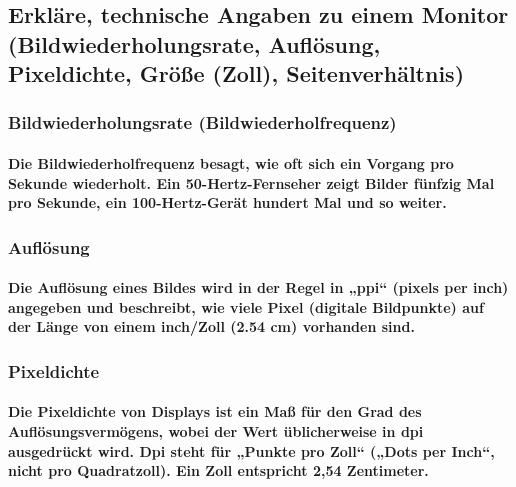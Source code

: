 \documentclass[a4paper]{article}
\begin{document}
    \subsection{\color{red}Erkläre, technische Angaben zu einem Monitor (Bildwiederholungsrate, Auflösung, Pixeldichte,
        Größe (Zoll), Seitenverhältnis)}\label{subsec:erkläre-technische-angaben-zu-einem-monitor-(bildwiederholungsrate-auflösung-pixeldichte
    --------größe-(zoll)-seitenverhältnis)}

    \subsubsection{\color{codegreen}Bildwiederholungsrate (Bildwiederholfrequenz)}

    \paragraph{\color{codegreen} Die Bildwiederholfrequenz besagt, wie oft sich ein Vorgang pro Sekunde wiederholt. Ein 50-Hertz-Fernseher zeigt Bilder fünfzig Mal pro Sekunde, ein 100-Hertz-Gerät hundert Mal und so weiter.}

    \subsubsection{\color{codegreen}Auflösung}

    \paragraph{\color{codegreen} Die Auflösung eines Bildes wird in der Regel in „ppi“ (pixels per inch) angegeben und beschreibt, wie viele Pixel (digitale Bildpunkte) auf der Länge von einem inch/Zoll (2.54 cm) vorhanden sind.}

    \subsubsection{\color{codegreen}Pixeldichte}

    \paragraph{\color{codegreen} Die Pixeldichte von Displays ist ein Maß für den Grad des Auflösungsvermögens, wobei der Wert üblicherweise in dpi ausgedrückt wird. Dpi steht für „Punkte pro Zoll“ („Dots per Inch“, nicht pro Quadratzoll). Ein Zoll entspricht 2,54 Zentimeter.}
\end{document}
